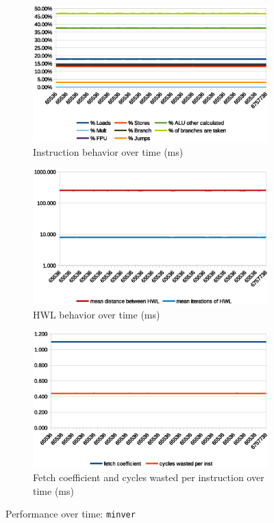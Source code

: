 \documentclass[../bachelor_paper.tex]{subfiles}
\begin{document}
\begin{figure}
    \begin{subfigure}{0.45\textwidth}
        \includegraphics[width=\textwidth]{img/graph/embench/minver_inst.eps}
        \caption{Instruction behavior over time (ms)}
    \end{subfigure}
    \begin{subfigure}{0.45\textwidth}
        \includegraphics[width=\textwidth]{img/graph/embench/minver_hwl.eps}
        \caption{\ac{HWL} behavior over time (ms)}
    \end{subfigure}
    \begin{subfigure}{0.45\textwidth}
        \includegraphics[width=\textwidth]{img/graph/embench/minver_fetch_waste.eps}
        \caption{Fetch coefficient and cycles wasted per instruction over time (ms)}
    \end{subfigure}
    \caption{Performance over time: \texttt{minver}}
\end{figure}
\end{document}
